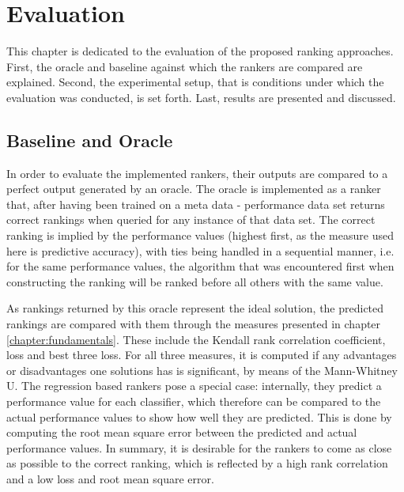 %
\chapter{Evaluation}
\label{sec:evaluation}

This chapter is dedicated to the evaluation of the proposed ranking approaches. First, the oracle and baseline against which the rankers are compared are explained. Second, the experimental setup, that is conditions under which the evaluation was conducted, is set forth. Last, results are presented and discussed.

\section{Baseline and Oracle}
In order to evaluate the implemented rankers, their outputs are compared to a perfect output generated by an oracle. The oracle is implemented as a ranker that, after having been trained on a meta data - performance data set returns correct rankings when queried for any instance of that data set. The correct ranking is implied by the performance values (highest first, as the measure used here is predictive accuracy), with ties being handled in a sequential manner, i.e. for the same performance values, the algorithm that was encountered first when constructing the ranking will be ranked before all others with the same value.

As rankings returned by this oracle represent the ideal solution, the predicted rankings are compared with them through the measures presented in chapter \ref{chapter:fundamentals}. These include the Kendall rank correlation coefficient, loss and best three loss. For all three measures, it is computed if any advantages or disadvantages one solutions has is significant, by means of the Mann-Whitney U. The regression based rankers pose a special case: internally, they predict a performance value for each classifier, which therefore can be compared to the actual performance values to show how well they are predicted. This is done by computing the root mean square error between the predicted and actual performance values. In summary, it is desirable for the rankers to come as close as possible to the correct ranking, which is reflected by a high rank correlation and a low loss and root mean square error.

